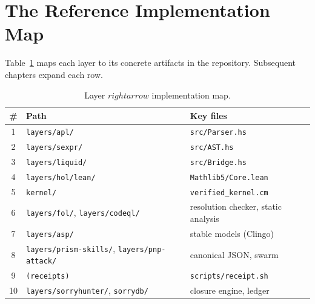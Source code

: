 \section{The Reference Implementation Map}
\label{sec:vscp-map}

Table~\ref{tab:impl-map} maps each layer to its concrete artifacts in the
repository. Subsequent chapters expand each row.

\begin{table}[H]
\centering
\caption{Layer $\ensuremath{rightarrow}$ implementation map.}
\label{tab:impl-map}
\begin{tabularx}{\textwidth}{clX}
\toprule
\textbf{\#} & \textbf{Path} & \textbf{Key files} \\
\midrule
1  & \texttt{layers/apl/}        & \texttt{src/Parser.hs} \\
2  & \texttt{layers/sexpr/}      & \texttt{src/AST.hs} \\
3  & \texttt{layers/liquid/}     & \texttt{src/Bridge.hs} \\
4  & \texttt{layers/hol/lean/}   & \texttt{Mathlib5/Core.lean} \\
5  & \texttt{kernel/}            & \texttt{verified\_kernel.cm} \\
6  & \texttt{layers/fol/}, \texttt{layers/codeql/} & resolution checker, static analysis \\
7  & \texttt{layers/asp/}        & stable models (Clingo) \\
8  & \texttt{layers/prism-skills/}, \texttt{layers/pnp-attack/} & canonical JSON, swarm \\
9  & \texttt{(receipts)}         & \texttt{scripts/receipt.sh} \\
10 & \texttt{layers/sorryhunter/}, \texttt{sorrydb/} & closure engine, ledger \\
\bottomrule
\end{tabularx}
\end{table}
